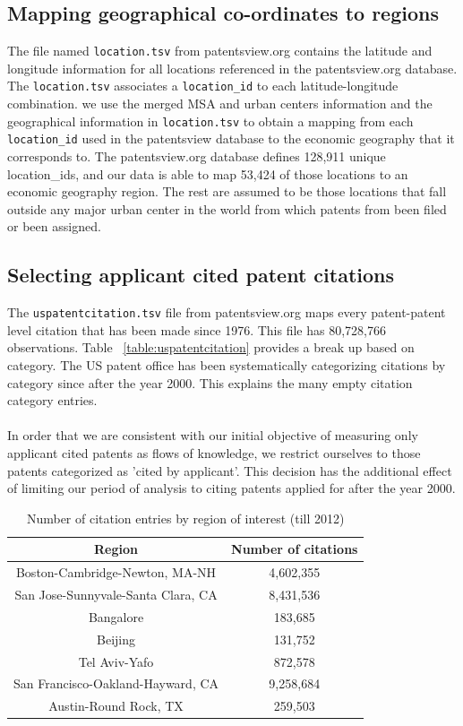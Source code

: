 \documentclass[12pt]{article}
\begin{document}
\subsection{Mapping geographical co-ordinates to regions}
The file named \verb|location.tsv| from patentsview.org contains the latitude and longitude information for all locations referenced in the patentsview.org database. The \verb|location.tsv| associates a \verb|location_id| to each latitude-longitude combination. we use the merged MSA and urban centers information and the geographical information in \verb|location.tsv| to obtain a mapping from each \verb|location_id| used in the patentsview database to the economic geography that it corresponds to. The patentsview.org database defines 128,911 unique location\_ids, and our data is able to map 53,424 of those locations to an economic geography region. The rest are assumed to be those locations that fall outside any major urban center in the world from which patents from been filed or been assigned.

\subsection{Selecting applicant cited patent citations}
The \verb|uspatentcitation.tsv| file from patentsview.org maps every patent-patent level citation that has been made since 1976. This file has 80,728,766 observations. Table ~\ref{table:uspatentcitation} provides a break up based on category. The US patent office has been systematically categorizing citations by category since after the year 2000. This explains the many empty citation category entries. 
\\\\
In order that we are consistent with our initial objective of measuring only applicant cited patents as flows of knowledge, we restrict ourselves to those patents categorized as 'cited by applicant'. This decision has the additional effect of limiting our period of analysis to citing patents applied for after the year 2000. 
\begin{table}
\begin{centering}
\caption {Number of citation entries by region of interest (till 2012)}
\label{table:selected-citations}
\begin{tabular}{|c|c|}
\hline
\textbf{Region}&\textbf{Number of citations}\\\hline
Boston-Cambridge-Newton, MA-NH&4,602,355\\\hline
San Jose-Sunnyvale-Santa Clara, CA&8,431,536\\\hline
Bangalore&183,685\\\hline
Beijing&131,752\\\hline
Tel Aviv-Yafo&872,578\\\hline
San Francisco-Oakland-Hayward, CA&9,258,684\\\hline
Austin-Round Rock, TX&259,503\\\hline
\end{tabular}

\end{centering}
\end{table}
\end{document}
